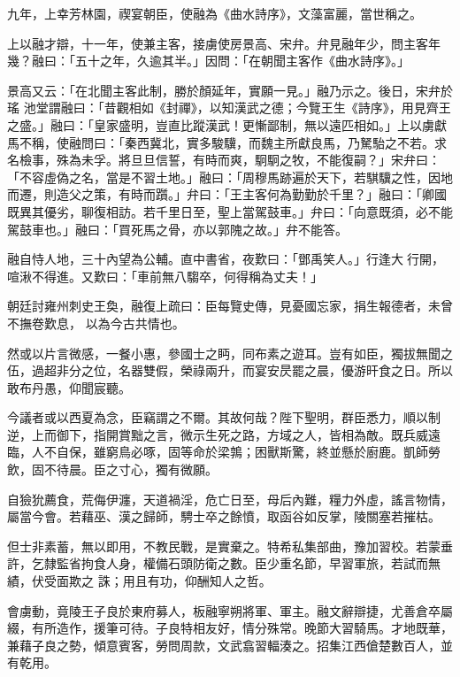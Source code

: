 \begin{pinyinscope}
 九年，上幸芳林園，禊宴朝臣，使融為《曲水詩序》，文藻富麗，當世稱之。



 上以融才辯，十一年，使兼主客，接虜使房景高、宋弁。弁見融年少，問主客年幾？融曰：「五十之年，久逾其半。」因問：「在朝聞主客作《曲水詩序》。」



 景高又云：「在北聞主客此制，勝於顏延年，實願一見。」融乃示之。後日，宋弁於瑤
 池堂謂融曰：「昔觀相如《封禪》，以知漢武之德；今覽王生《詩序》，用見齊王之盛。」融曰：「皇家盛明，豈直比蹤漢武！更慚鄙制，無以遠匹相如。」上以虜獻馬不稱，使融問曰：「秦西冀北，實多駿驥，而魏主所獻良馬，乃駑駘之不若。求名檢事，殊為未孚。將旦旦信誓，有時而爽，駉駉之牧，不能復嗣？」宋弁曰：「不容虛偽之名，當是不習土地。」融曰：「周穆馬跡遍於天下，若騏驥之性，因地而遷，則造父之策，有時而躓。」弁曰：「王主客何為勤勤於千里？」融曰：「卿國既異其優劣，聊復相訪。若千里日至，聖上當駕鼓車。」弁曰：「向意既須，必不能駕鼓車也。」融曰：「買死馬之骨，亦以郭隗之故。」弁不能答。



 融自恃人地，三十內望為公輔。直中書省，夜歎曰：「鄧禹笑人。」行逢大行開，喧湫不得進。又歎曰：「車前無八騶卒，何得稱為丈夫！」



 朝廷討雍州刺史王奐，融復上疏曰：臣每覽史傳，見憂國忘家，捐生報德者，未曾不撫卷歎息，
 以為今古共情也。



 然或以片言微感，一餐小惠，參國士之眄，同布素之遊耳。豈有如臣，獨拔無聞之伍，過超非分之位，名器雙假，榮祿兩升，而宴安昃罷之晨，優游旰食之日。所以敢布丹愚，仰聞宸聽。



 今議者或以西夏為念，臣竊謂之不爾。其故何哉？陛下聖明，群臣悉力，順以制逆，上而御下，指開賞黜之言，微示生死之路，方域之人，皆相為敵。既兵威遠臨，人不自保，雖窮鳥必啄，固等命於梁鶉；困獸斯驚，終並懸於廚鹿。凱師勞飲，固不待晨。臣之寸心，獨有微願。



 自獫狁薦食，荒侮伊瀍，天道禍淫，危亡日至，母后內難，糧力外虛，謠言物情，屬當今會。若藉巫、漢之歸師，騁士卒之餘憤，取函谷如反掌，陵關塞若摧枯。



 但士非素蓄，無以即用，不教民戰，是實棄之。特希私集部曲，豫加習校。若蒙垂許，乞隸監省拘食人身，權備石頭防衛之數。臣少重名節，早習軍旅，若試而無績，伏受面欺之
 誅；用且有功，仰酬知人之哲。



 會虜動，竟陵王子良於東府募人，板融寧朔將軍、軍主。融文辭辯捷，尤善倉卒屬綴，有所造作，援筆可待。子良特相友好，情分殊常。晚節大習騎馬。才地既華，兼藉子良之勢，傾意賓客，勞問周款，文武翕習輻湊之。招集江西傖楚數百人，並有乾用。




\end{pinyinscope}
